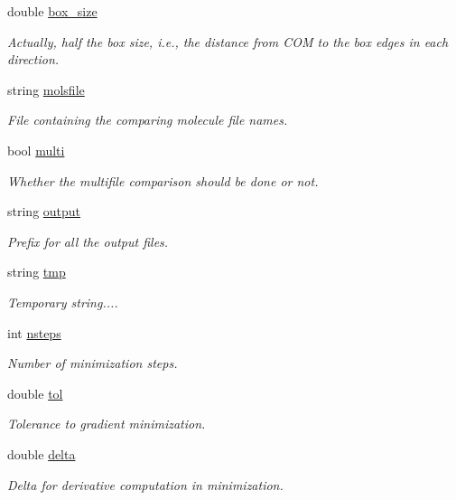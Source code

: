 \begin{DoxyCompactItemize}
double \hyperlink{classParser_a10e43de411867ce8d978b4da09595274}{box\_\-size}
\begin{DoxyCompactList}\small\item\em Actually, half the box size, i.e., the distance from COM to the box edges in each direction. \end{DoxyCompactList}\item 
string \hyperlink{classParser_aabdbf6e55bcc06654dac165f6b5bc427}{molsfile}
\begin{DoxyCompactList}\small\item\em File containing the comparing molecule file names. \end{DoxyCompactList}\item 
bool \hyperlink{classParser_aa1083e4b4f1db0abf7ab28a1ef55e9df}{multi}
\begin{DoxyCompactList}\small\item\em Whether the multifile comparison should be done or not. \end{DoxyCompactList}\item 
string \hyperlink{classParser_a39ef75157a58e058f258a6ca4b9de7a5}{output}
\begin{DoxyCompactList}\small\item\em Prefix for all the output files. \end{DoxyCompactList}\item 
string \hyperlink{classParser_a30d6b0f27feee6006fc83f3dc477493b}{tmp}
\begin{DoxyCompactList}\small\item\em Temporary string.... \end{DoxyCompactList}\item 
int \hyperlink{classParser_a32c82268dfcd000070219f3d8a243cd6}{nsteps}
\begin{DoxyCompactList}\small\item\em Number of minimization steps. \end{DoxyCompactList}\item 
double \hyperlink{classParser_a43b1eddc700d5b2049d1ee701592b96a}{tol}
\begin{DoxyCompactList}\small\item\em Tolerance to gradient minimization. \end{DoxyCompactList}\item 
double \hyperlink{classParser_a8cc4bd73e4cefb212d6db5ef3e9c5825}{delta}
\begin{DoxyCompactList}\small\item\em Delta for derivative computation in minimization. \end{DoxyCompactList}\item 

\end{DoxyCompactItemize}
